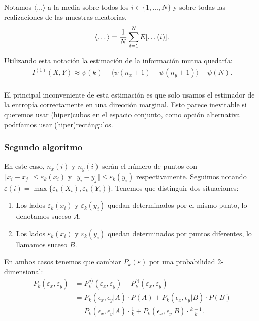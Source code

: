 \documentclass[12pt,a4paper]{report} %
\let\mathbb\relax
\theoremstyle{definition}
\begin{document}
Notamos $\langle \dots \rangle$ a la media sobre todos los $i\in\{1,\dots,N\}$ y sobre todas las realizaciones de las muestras aleatorias,\[
\langle \dots \rangle = \frac{1}{N} \sum_{i=1}^N\mathbb{E}[\dots(i)].
\]

Utilizando esta notación la estimación de la información mutua quedaría:
\begin{align}
I^{(1)}(X,Y) \approx \psi(k) - \langle \psi(n_x+1) + \psi(n_y+1) \rangle + \psi(N).\label{eq:est1}
\end{align}\\[-10pt]

El principal inconveniente de esta estimación es que solo usamos el estimador de la entropía correctamente en una dirección marginal. Esto parece inevitable si queremos usar (hiper)cubos en el espacio conjunto, como opción alternativa podríamos usar (hiper)rectángulos.\\

\subsubsection{Segundo algoritmo}

En este caso, $n_x(i)$ y $n_y(i)$ serán el número de puntos con $\Vert x_i - x_j \Vert \leq \varepsilon_k(x_i)$ y $\Vert y_i - y_j \Vert \leq \varepsilon_k(y_i)$ respectivamente. Seguimos notando $\varepsilon(i) = \max \{\varepsilon_k(X_i), \varepsilon_k(Y_i)\}$. Tenemos que distinguir dos situaciones:

\begin{enumerate}[label={\alph*)}]
\item Los lados $\varepsilon_k(x_i)$ y $\varepsilon_k(y_i)$ quedan determinados por el mismo punto, lo denotamos suceso $A$.
\item Los lados $\varepsilon_k(x_i)$ y $\varepsilon_k(y_i)$ quedan determinados por puntos diferentes, lo llamamos suceso $B$.
\end{enumerate}

En ambos casos tenemos que cambiar $P_k(\varepsilon)$ por una probabilidad 2-dimensional:
\begin{align*}
  P_k(\varepsilon_x, \varepsilon_y) &= P_k^{a)}(\varepsilon_x, \varepsilon_y) + P_k^{b)}(\varepsilon_x, \varepsilon_y)\\[3pt] &= P_k\left (\epsilon_x, \epsilon_y | A \right) \cdot P (A) + P_k\left (\epsilon_x, \epsilon_y | B \right) \cdot P(B)\\
  &= P_k\left (\epsilon_x, \epsilon_y | A \right) \cdot \frac{1}{k} + P_k\left (\epsilon_x, \epsilon_y | B \right) \cdot \frac{k-1}{k}.\\[-5pt]
\end{align*}
\end{document}
